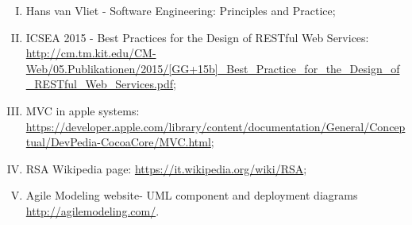 \begin{enumerate}[(I)]
  \item Hans van Vliet - Software Engineering: Principles and Practice;
  \item ICSEA 2015 - Best Practices for the Design of RESTful Web Services: \url{http://cm.tm.kit.edu/CM-Web/05.Publikationen/2015/[GG+15b]_Best_Practice_for_the_Design_of_RESTful_Web_Services.pdf};
  \item MVC in apple systems: \url{https://developer.apple.com/library/content/documentation/General/Conceptual/DevPedia-CocoaCore/MVC.html};
  \item RSA Wikipedia page: \url{https://it.wikipedia.org/wiki/RSA};
  \item Agile Modeling website- UML component and deployment diagrams \url{http://agilemodeling.com/}.
\end{enumerate}